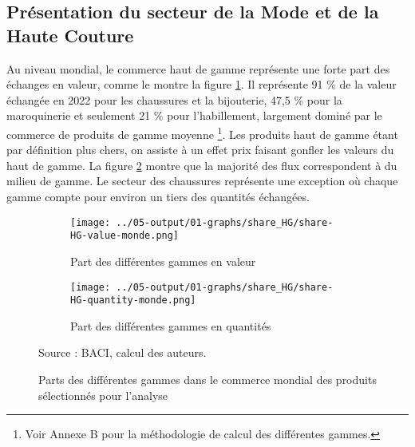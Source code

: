 \documentclass[french,10pt,a4paper]{article}
\begin{document}
\subsection{Présentation du secteur de la Mode et de la Haute Couture}

Au niveau mondial, le commerce haut de gamme représente une forte part des échanges en valeur, comme le montre la figure \ref{fig:share-HG-value-monde}. Il représente 91 \% de la valeur échangée en 2022 pour les chaussures et la bijouterie, 47,5 \% pour la maroquinerie et seulement 21 \% pour l'habillement, largement dominé par le commerce de produits de gamme moyenne \footnote{Voir Annexe B pour la méthodologie de calcul des différentes gammes.}. Les produits haut de gamme étant par définition plus chers, on assiste à un effet prix faisant gonfler les valeurs du haut de gamme. La figure \ref{fig:share-HG-quantity-monde} montre que la majorité des flux correspondent à du milieu de gamme. Le secteur des chaussures représente une exception où chaque gamme compte pour environ un tiers des quantités échangées.

\begin{figure}[!h]
  \centering
  \begin{subfigure}{\textwidth}
    \centering    
    \texttt{[image: ../05-output/01-graphs/share\_HG/share-HG-value-monde.png]}
    \caption{Part des différentes gammes en valeur}
    \label{fig:share-HG-value-monde}
  \end{subfigure}
  \vspace{0.5cm}
  \begin{subfigure}{\textwidth}
    \centering
 \texttt{[image: ../05-output/01-graphs/share\_HG/share-HG-quantity-monde.png]}
 \caption{Part des différentes gammes en quantités}
 \label{fig:share-HG-quantity-monde}
\end{subfigure}
\captionsetup{justification=raggedright,singlelinecheck=false, font=small}
  \caption*{Source : BACI, calcul des auteurs.}
  \captionsetup{justification=centering, singlelinecheck=true, font=normalsize}
  \caption{Parts des différentes gammes dans le commerce mondial des produits sélectionnés pour l'analyse}
  \label{fig:share-HG-value-quantity-monde}
\end{figure}

\bigskip
\end{document}

